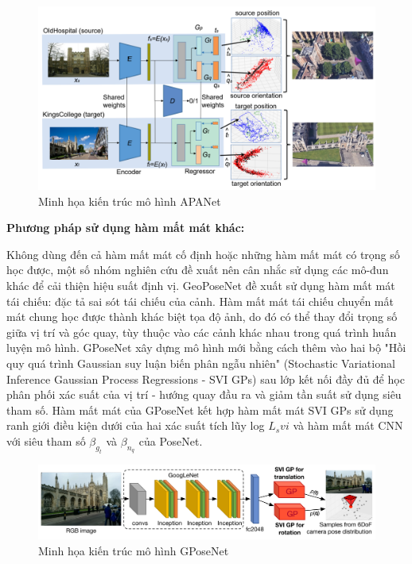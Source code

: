 \begin{figure}[H]
    \centering
    \includegraphics[width=\textwidth]{pics/Chapter2/apanet.png}
    \caption{Minh họa kiến trúc mô hình APANet \cite{chidlovskii2020adversarial}}
\end{figure}
\noindent\textbf{Phương pháp sử dụng hàm mất mát khác:}

Không dùng đến cả hàm mất mát cố định hoặc những hàm mất mát có trọng số học được, một số nhóm nghiên cứu đề xuất nên cân nhắc sử dụng các mô-đun khác để cải thiện hiệu suất định vị. GeoPoseNet \cite{kendall2017geometric} đề xuất sử dụng hàm mất mát tái chiếu: đặc tả sai sót tái chiếu của cảnh. Hàm mất mát tái chiếu chuyển mất mát chung học được thành khác biệt tọa độ ảnh, do đó có thể thay đổi trọng số giữa vị trí và góc quay, tùy thuộc vào các cảnh khác nhau trong quá trình huấn luyện mô hình. GPoseNet \cite{Cai2018AHP} xây dựng mô hình mới bằng cách thêm vào hai bộ "Hồi quy quá trình Gaussian suy luận biến phân ngẫu nhiên" (Stochastic Variational Inference Gaussian Process Regressions - SVI GPs) sau lớp kết nối đầy đủ để học phân phối xác suất của vị trí - hướng quay đầu ra và giảm tần suất sử dụng siêu tham số. Hàm mất mát của GPoseNet kết hợp hàm mất mát SVI GPs sử dụng ranh giới điều kiện dưới của hai xác suất tích lũy log $L_{s}vi$ và hàm mất mát CNN với siêu tham số $\beta_{g_{t}}$ và $\beta_{n_{q}}$ của PoseNet.
\begin{figure}[H]
    \centering
    \includegraphics[width=\textwidth]{pics/Chapter2/gposenet.png}
    \caption{Minh họa kiến trúc mô hình GPoseNet \cite{kendall2017geometric}}
\end{figure}

